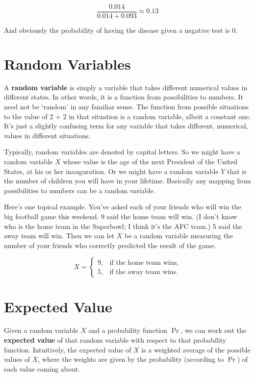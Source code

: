 \documentclass[11pt,]{article}
\begin{document}
\[
\frac{0.014}{0.014 + 0.093} \approx 0.13
\]

And obviously the probability of having the disease given a negative
test is 0.

\hypertarget{random-variables}{%
\section{Random Variables}\label{random-variables}}

A \textbf{random variable} is simply a variable that takes different
numerical values in different states. In other words, it is a function
from possibilities to numbers. It need not be `random' in any familiar
sense. The function from possible situations to the value of 2 + 2 in
that situation is a random variable, albeit a constant one. It's just a
slightly confusing term for any variable that takes different,
numerical, values in different situations.

Typically, random variables are denoted by capital letters. So we might
have a random variable \(X\) whose value is the age of the next
President of the United States, at his or her inauguration. Or we might
have a random variable \(Y\) that is the number of children you will
have in your lifetime. Basically any mapping from possibilities to
numbers can be a random variable.

Here's one topical example. You've asked each of your friends who will
win the big football game this weekend. 9 said the home team will win.
(I don't know who is the home team in the Superbowl; I think it's the
AFC team.) 5 said the away team will win. Then we can let \(X\) be a
random variable measuring the number of your friends who correctly
predicted the result of the game.

\begin{equation*}
X = 
    \begin{cases}
        9,& \text{if the home team wins} ,\\ 
        5,& \text{if the away team wins} .
    \end{cases}
\end{equation*}

\hypertarget{expected-value}{%
\section{Expected Value}\label{expected-value}}

Given a random variable \(X\) and a probability function \(\Pr\), we can
work out the \textbf{expected value} of that random variable with
respect to that probability function. Intuitively, the expected value of
\(X\) is a weighted average of the possible values of \(X\), where the
weights are given by the probability (according to \(\Pr\)) of each
value coming about.
\end{document}

